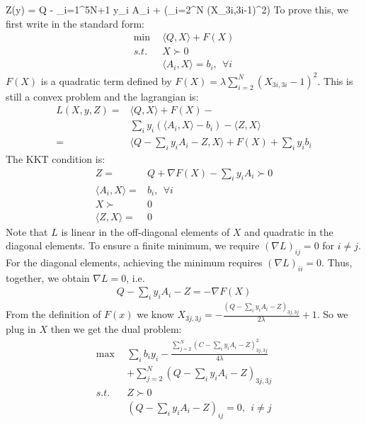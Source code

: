 \bea
    Z(y) = Q - \sum_{i=1}^{5N+1} y_i A_i + \lambda \nabla(\sum_{i=2}^{N} (X_{3i,3i}-1)^2)
\eea
To prove this, we first write  in the standard form:
\begin{align}
\min ~~&\langle Q, X \rangle + F(X)\\
s.t. ~~&X \succ 0\\
& \langle A_i, X \rangle = b_i, ~~\forall i
\end{align}
$F(X)$ is a quadratic term defined by $\displaystyle F(X) = \lambda \sum_{i=2}^{N} (X_{3i,3i}-1)^2$. This is still a convex problem and the lagrangian is:
\begin{align}
L(X, y, Z) =& \langle Q, X \rangle + F(X) - \\&\sum_i y_i (\langle A_i, X \rangle - b_i) - \langle Z, X \rangle \\
=& \langle Q - \sum_i y_i A_i - Z, X \rangle + F(X) + \sum_i y_i b_i
\end{align}
The KKT condition is:
\begin{align}
Z =& Q + \nabla F(X) - \sum_i y_i A_i \succ 0 \\
\langle A_i, X \rangle =& b_i, ~~\forall i \\
X \succ & 0 \\
\langle Z, X \rangle = & 0
\end{align}
Note that $L$ is linear in the off-diagonal elements of $X$ and quadratic in the diagonal elements. To ensure a finite minimum, we require $(\nabla L)_{ij} = 0$ for $i \neq j$. For the diagonal elements, achieving the minimum requires $(\nabla L)_{ii} = 0$. Thus, together, we obtain $\nabla L = 0$, i.e.
\begin{align}
Q - \sum_i y_i A_i - Z = -\nabla F(X)
\end{align}
From the definition of $F(x)$ we know $X_{3j,3j} = -\frac{(Q - \sum_i y_i A_i - Z)_{3j,3j}}{2\lambda} + 1$. So we plug in $X$ then we get the dual problem:
\begin{align}
\max ~~&\sum_i b_i y_i - \frac{\sum_{j=2}^N (C - \sum_i y_i A_i - Z)_{3j,3j}^2}{4\lambda} 
\\ & + \sum_{j=2}^N (Q - \sum_i y_i A_i - Z)_{3j,3j} \\
s.t. ~~&Z \succ 0\\
        ~~&(Q - \sum_i y_i A_i - Z)_{ij} = 0, ~~i\neq j    
\end{align}
